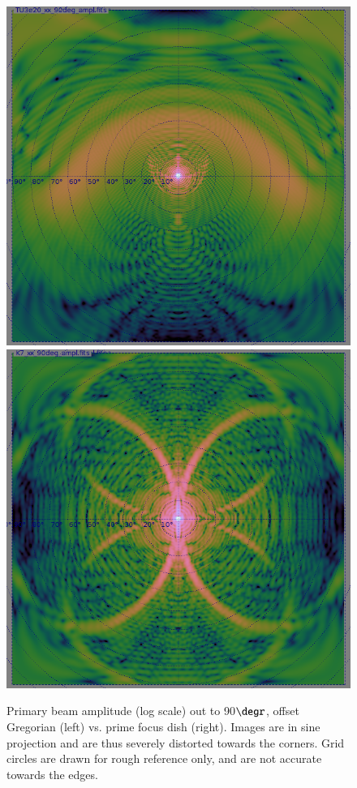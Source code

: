 \documentclass{aa}
\begin{document}
\begin{figure}
  \includegraphics[width=\columnwidth]{beam-og-90}\hfill%
  \includegraphics[width=\columnwidth]{beam-pf-90}
  \caption{\label{fig:pb90}Primary beam amplitude (log scale) out to 90$\degr$, offset Gregorian (left) vs. prime focus dish (right). Images are in sine projection and are thus severely distorted towards the corners. Grid circles are drawn for rough reference only, and are not accurate towards the edges.}
\end{figure}
\end{document}

